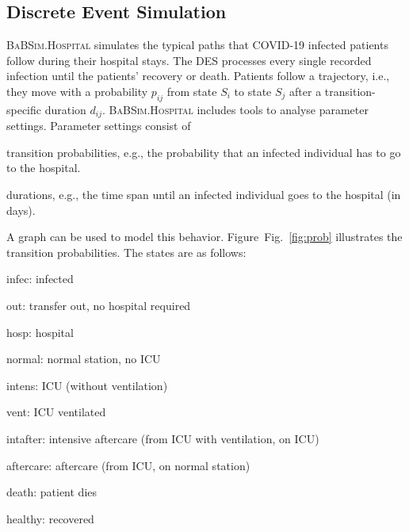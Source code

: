 \documentclass[conference]{IEEEtran}
\def\figref#1{Fig.~\ref{#1}}
\newcommand{\babsimhospital}{\textsc{BaBSim.Hospital}\xspace}
\begin{document}
\subsection{Discrete Event Simulation}
\babsimhospital simulates the typical paths that COVID-19 infected patients follow during their hospital stays. 
The \gls{DES} processes every single recorded infection until the patients' recovery or death. 
Patients follow a trajectory, i.e., they move with a probability $p_{ij}$ from state $S_i$ to state $S_j$  after a transition-specific duration $d_{ij}$.
\babsimhospital includes tools to analyse parameter settings.
Parameter settings consist of
\begin{compactitem}
\item transition probabilities, e.g., the probability that an infected
   individual has to go to the hospital. 
\item  durations, e.g., the time span until an infected individual goes to the
   hospital (in days). 
\end{compactitem}
A graph can be used to model this behavior.
Figure~\figref{fig:prob} illustrates the transition probabilities.
The states are as follows:
\begin{compactenum}
\item infec: infected
\item out: transfer out, no hospital required
\item hosp: hospital
\item normal: normal station, no ICU
\item intens: ICU (without ventilation)
\item vent: ICU ventilated
\item intafter: intensive aftercare (from ICU with ventilation, on ICU)
\item aftercare: aftercare (from ICU,  on normal station)
\item death: patient dies
\item healthy: recovered
\end{compactenum}
 
\end{document}
